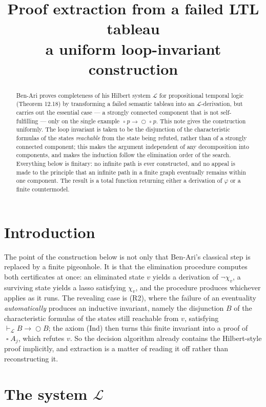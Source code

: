 \documentclass[11pt,a4paper]{article}
\title{Proof extraction from a failed LTL tableau\\
{\large a uniform loop-invariant construction}}
\author{}
\date{}
\theoremstyle{definition}
\newcommand{\Next}{\mathop{\bigcirc}}
\newcommand{\Always}{\mathop{\square}}
\newcommand{\proves}{\vdash_{\mathcal{L}}}
\begin{document}
\maketitle

\begin{abstract}
Ben-Ari proves completeness of his Hilbert system $\mathcal{L}$ for
propositional temporal logic (Theorem 12.18) by transforming a failed semantic
tableau into an $\mathcal{L}$-derivation, but carries out the essential case ---
a strongly connected component that is not self-fulfilling --- only on the
single example $\Always p\to\Next\Always p$.  This note gives the construction
uniformly.  The loop invariant is taken to be the disjunction of the
characteristic formulas of the states \emph{reachable} from the state being
refuted, rather than of a strongly connected component; this makes the argument
independent of any decomposition into components, and makes the induction follow
the elimination order of the search.  Everything below is finitary: no infinite
path is ever constructed, and no appeal is made to the principle that an
infinite path in a finite graph eventually remains within one component.  The
result is a total function returning either a derivation of $\varphi$ or a finite
countermodel.
\end{abstract}

\section*{Introduction}

The point of the construction below is not only that Ben-Ari's classical step is
replaced by a finite pigeonhole.  It is that the elimination procedure computes
both certificates at once: an eliminated state $v$ yields a derivation of
$\neg\chi_v$, a surviving state yields a lasso satisfying $\chi_v$, and the
procedure produces whichever applies as it runs.  The revealing case is (R2),
where the failure of an eventuality \emph{automatically} produces an inductive
invariant, namely the disjunction $B$ of the characteristic formulas of the
states still reachable from $v$, satisfying $\proves B\to\Next B$; the axiom
(Ind) then turns this finite invariant into a proof of $\Always A_j$, which
refutes $v$.  So the decision algorithm already contains the Hilbert-style proof
implicitly, and extraction is a matter of reading it off rather than
reconstructing it.

\section{The system $\mathcal{L}$}
\end{document}
